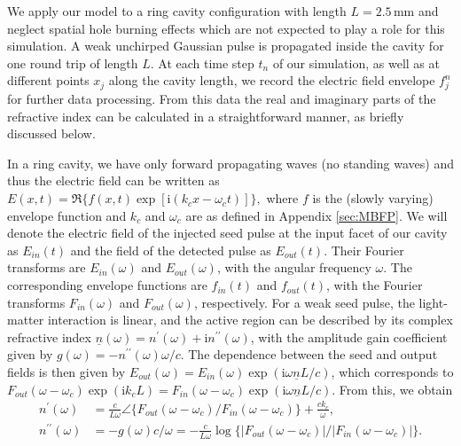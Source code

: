 \documentclass[10pt]{article}
\begin{document}
	We apply our model to a ring cavity configuration with length $L=2.5{\,}%
	\mathrm{mm}$ and neglect spatial hole burning effects which are not expected
	to play a role for this simulation. A weak unchirped Gaussian pulse is
	propagated inside the cavity for one round trip of length $L$. At each time step $t_{n}$ of our
	simulation, as well as at different points $x_{j}$ along the cavity length, we
	record the electric field envelope $f_{j}^{n}$ for further data processing.
	From this data the real and imaginary parts of the refractive index can be
	calculated in a straightforward manner, as briefly discussed below.
	
	In a ring cavity, we have only forward propagating waves (no standing waves)
	and thus the electric field can be written as
$
		E(x,t)=\Re\{f(x,t)\exp\left[  \mathrm{i}(k_{c}x-\omega_{c}t)\right]
		\} ,
$
	where $f$ is the (slowly varying) envelope function and $k_c$ and $\omega_c$ are as defined in Appendix \ref{sec:MBFP}. We will denote the
	electric field of the injected seed pulse at the input facet of our cavity as
	$E_{in}(t)$ and the field of the detected pulse as $E_{out}(t)$. Their Fourier
	transforms are $E_{in}(\omega)$ and $E_{out}(\omega)$, with the angular
	frequency $\omega$. The corresponding envelope functions are $f_{in}\left(
	t\right)  $ and $f_{out}\left(  t\right)  $, with the Fourier transforms
	$F_{in}\left(  \omega\right)  $ and $F_{out}\left(  \omega\right) $, respectively. For a
	weak seed pulse, the light-matter interaction is linear, and the active region
	can be described by its complex refractive index $\underline{n}\left(
	\omega\right)  =n^{\prime}\left(  \omega\right)  +\mathrm{i}n^{\prime\prime
	}\left(  \omega\right)  $, with the amplitude gain coefficient given by
	$g(\omega)=-n^{\prime\prime}(\omega)\omega/c$. The dependence between the seed
	and output fields is then given by $E_{out}(\omega)=E_{in}(\omega)\exp\left(
	\mathrm{i}\omega\underline{n}L/c\right)  $, which corresponds to
	$F_{out}(\omega-\omega_{c})\exp(\mathrm{i}k_{c}L)=F_{in}(\omega-\omega
	_{c})\exp\left(  \mathrm{i}\omega\underline{n}L/c\right)  $. From this, we
	obtain
	\begin{align}
		n^{\prime}(\omega)  & =\frac{c}{L\omega}\angle\{F_{out}(\omega-\omega
		_{c})/F_{in}(\omega-\omega_{c})\}+\frac{ck_{c}}{\omega}, \\
		n^{\prime\prime}(\omega)  &  =-g(\omega)c/\omega=-\frac{c}{L\omega}%
		\log\{|F_{out}(\omega-\omega_{c})|/|F_{in}(\omega-\omega_{c})|\}.
		\label{eq:gaineq}%
	\end{align}
\end{document}
